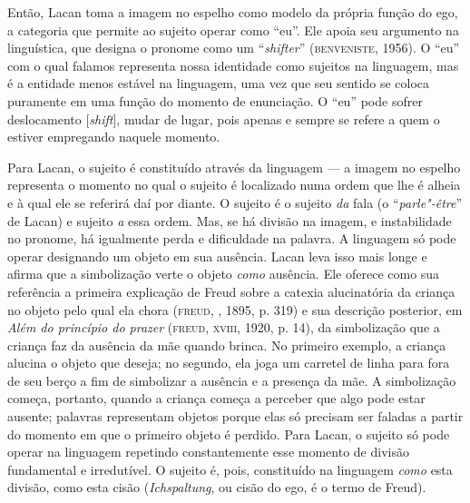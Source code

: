 Então, Lacan toma a imagem no espelho como modelo da própria função do
ego, a categoria que permite ao sujeito operar como ``eu''. Ele apoia
seu argumento na linguística, que designa o pronome como um
``\emph{shifter}'' (\textsc{benveniste}, 1956). O ``eu'' com o qual falamos
representa nossa identidade como sujeitos na linguagem, mas é a entidade
menos estável na linguagem, uma vez que seu sentido se coloca puramente
em uma função do momento de enunciação. O ``eu'' pode sofrer
deslocamento {[}\emph{shift}{]}, mudar de lugar, pois apenas e sempre se
refere a quem o estiver empregando naquele momento.

Para Lacan, o sujeito é constituído através da linguagem --- a imagem no
espelho representa o momento no qual o sujeito é localizado numa ordem
que lhe é alheia e à qual ele se referirá daí por diante. O sujeito é o
sujeito \emph{da} fala (o ``\emph{parle"-être}'' de Lacan) e sujeito
\emph{a} essa ordem. Mas, se há divisão na imagem, e instabilidade no
pronome, há igualmente perda e dificuldade na palavra. A linguagem só
pode operar designando um objeto em sua ausência. Lacan leva isso mais
longe e afirma que a simbolização verte o objeto \emph{como} ausência.
Ele oferece como sua referência a primeira explicação de Freud sobre a
catexia alucinatória da criança no objeto pelo qual ela chora (\textsc{freud}, ,
1895, p. 319) e sua descrição posterior, em \emph{Além do princípio do
prazer} (\textsc{freud}, \textsc{xviii}, 1920, p. 14), da simbolização que a criança faz
da ausência da mãe quando brinca. No primeiro exemplo, a criança alucina
o objeto que deseja; no segundo, ela joga um carretel de linha para fora
de seu berço a fim de simbolizar a ausência e a presença da mãe. A
simbolização começa, portanto, quando a criança começa a perceber que
algo pode estar ausente; palavras representam objetos porque elas só
precisam ser faladas a partir do momento em que o primeiro objeto é
perdido. Para Lacan, o sujeito só pode operar na linguagem repetindo
constantemente esse momento de divisão fundamental e irredutível. O
sujeito é, pois, constituído na linguagem \emph{como} esta divisão, como
esta cisão (\emph{Ichspaltung}, ou cisão do ego, é o termo de Freud).

